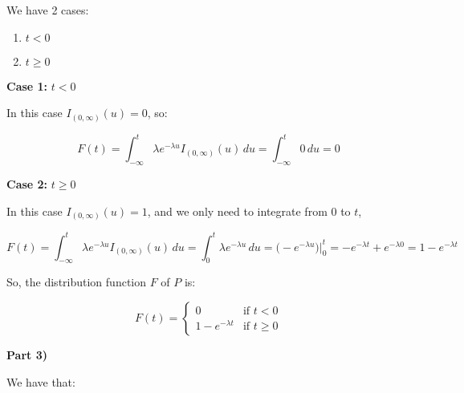 \singlespacing

We have 2 cases:

\singlespacing

\begin{enumerate}
    \item $t < 0$
    \item $t \geq 0$
\end{enumerate}

\singlespacing

\textbf{Case 1:} $t < 0$

\singlespacing

In this case $I_{(0,\infty)}(u) = 0$, so:

\singlespacing

\begin{equation}
    F(t) = \int_{-\infty}^{t} \lambda e^{-\lambda u}I_{(0,\infty)}(u) \, du = \int_{-\infty}^{t} 0 \, du = 0
\end{equation}

\singlespacing

\textbf{Case 2:} $t \geq 0$

\singlespacing

In this case $I_{(0,\infty)}(u) = 1$, and we only need to integrate from $0$ to $t$,

\singlespacing

\begin{equation}
    F(t) = \int_{-\infty}^{t} \lambda e^{-\lambda u}I_{(0,\infty)}(u) \, du = \int_{0}^{t} \lambda e^{-\lambda u} \, du = \Big(-e^{-\lambda u} \Big)\Big|_{0}^{t} = -e^{-\lambda t} + e^{-\lambda 0} = 1 - e^{-\lambda t}
\end{equation}

\singlespacing

So, the distribution function $F$ of $P$ is:

\singlespacing

\begin{equation}
    F(t) = \begin{cases}
        0                  & \text{if } t < 0    \\
        1 - e^{-\lambda t} & \text{if } t \geq 0
    \end{cases}
\end{equation}

\singlespacing

\textbf{Part 3)}

\singlespacing

We have that:

\singlespacing

